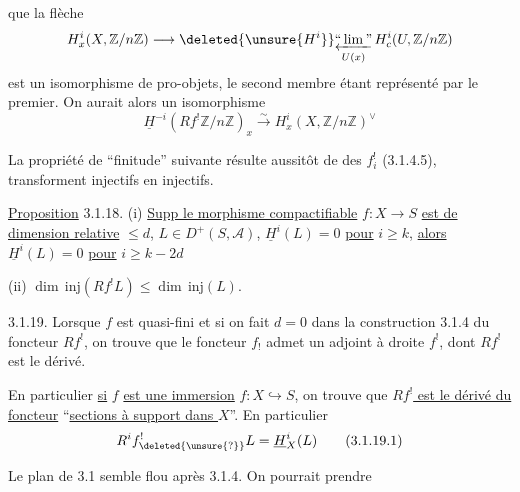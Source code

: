 que la flèche\unsure{/}
\[
 H_x^i(X,\mathbb Z/n\mathbb Z)\longrightarrow
 \deleted{\unsure{H^i}}\underset{U(x)}{\underleftarrow{\text{``}\lim\text{''}}}\,
 H_c^i(U,\mathbb Z/n\mathbb Z)
\]
est un isomorphisme de pro-objets, le second membre étant représenté par le premier. On aurait alors un isomorphisme
\[
 \underline H^{-i}(Rf^!\mathbb Z/n\mathbb Z)_x
 \xrightarrow{\sim} H_x^i(X,\mathbb Z/n\mathbb Z)^\vee
\]

La propriété de ``finitude'' suivante résulte aussitôt  de  des  $f_i^!$ (3.1.4.5),  transforment injectifs en injectifs.

\uline{Proposition} 3.1.18. (i) \uline{Supp le morphisme compactifiable} $f:X\longrightarrow S$ \uline{est de dimension relative} $\leq d$,   $L\in D^+(S,\mathcal A)$,   $\underline H^i(L)=0$ \uline{pour} $i\geq k$, \uline{alors} $\underline H^i(L)=0$ \uline{pour} $i\geq k-2d$


(ii) $\dim\mathrm{\,inj}(Rf^!L)\leq\dim\mathrm{\,inj}(L)$.

3.1.19. Lorsque $f$ est quasi-fini et si on fait $d=0$ dans la construction 3.1.4 du foncteur $Rf^!$, on trouve  que le foncteur $f_!$ admet un adjoint à droite $f^!$, dont $Rf^!$ est le dérivé.

En particulier \uline{si} $f$ \uline{est une immersion} $f:X\hookrightarrow S$, on trouve que \uline{$Rf^!$ est le dérivé du foncteur} ``\uline{sections à support dans $X$}''. En particulier
\[
 R^if^!_{\deleted{\unsure{?}}}L=\underline H_X^i(L)
 \tag*{(3.1.19.1)}
\]

Le plan de 3.1 semble flou après 3.1.4. On pourrait prendre


